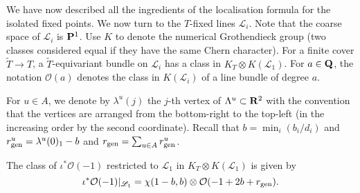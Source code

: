 \documentclass{amsart}
\renewcommand{\O}{\mathcal O}
\begin{document}
  We have now described all the ingredients of the localisation formula for the isolated fixed points.
  We now turn to the \(T\)-fixed lines \(\mathscr L_i\).
  Note that the coarse space of \(\mathscr L_i\) is \(\P^1\).
  Use \(K\) to denote the numerical Grothendieck group (two classes considered equal if they have the same Chern character).
  For a finite cover \(\widetilde T \to T\), a \(\widetilde T\)-equivariant bundle on \(\mathscr L_i\) has a class in \(K_T \otimes K(\mathscr L_1)\).
  For \(a \in \Q\), the notation \(\O(a)\) denotes the class in \(K(\mathscr L_i)\) of a line bundle of degree \(a\).
  
  For \(u \in A\), we denote by \(\lambda^u(j)\) the \(j\)-th vertex of \(\Lambda^u \subset \R^2\) with the convention that the vertices are arranged from the bottom-right to the top-left (in the increasing order by the second coordinate).
  Recall that \(b = \min_i(b_i/d_i)\) and \(r_{\rm gen}^u = \lambda^u(0)_1-b\) and \(r_{\rm gen} = \sum_{u \in A} r_{\rm gen}^u\).
  \begin{proposition}\label{prop:universalsub}
    The class of \(\iota^{*} \O(-1)\) restricted to \(\mathscr L_1\) in \(K_T \otimes K(\mathscr L_1)\) is given by
    \[\iota^{*} \O(-1)|_{\mathscr L_1} = \chi(1-b,b) \otimes \O(-1+2b+r_{\rm gen}).\]
  \end{proposition}
\end{document}
